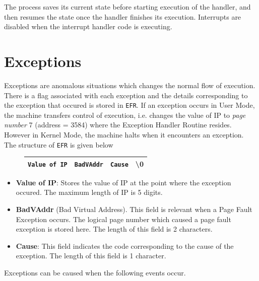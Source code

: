 \documentclass[11pt]{report}
\begin{document}
The process saves its current state before starting execution of the handler, and then resumes the state once the handler finishes its execution. Interrupts are disabled when the interrupt handler code is executing. 


\section{Exceptions}
\label{excpetion}
Exceptions are anomalous situations which changes the normal flow of execution. There is a flag associated with each exception and the details corresponding to the exception that occured is stored in \texttt{EFR}. If an exception occurs in User Mode, the machine transfers control of execution, i.e. changes the value of IP to \textit{page number} 7 (address = 3584) where the Exception Handler Routine resides. However in Kernel Mode, the machine halts when it encounters an exception. \\

The structure of \texttt{EFR} is given below
		\begin{figure}[htp!]
		\centering
		\begin{tabular}{|c|c|c|c|}
		\hline
		\texttt{Value of IP} & \texttt{BadVAddr} & \texttt{Cause} &  \textbackslash 0 \\
		\hline
		\end{tabular}
		\end{figure}

\begin{itemize}
\item \textbf{Value of IP}: Stores the value of IP at the point where the exception occured. The maximum length of IP is 5 digits.
\item \textbf{BadVAddr} (Bad Virtual Address). This field is relevant when a Page Fault Exception occurs. The logical page number which caused a page fault exception is stored here. The length of this field is 2 characters.
\item \textbf{Cause}: This field indicates the code corresponding to the cause of the exception. The length of this field is 1 character.
\end{itemize}

Exceptions can be caused when the following events occur.
\end{document}
